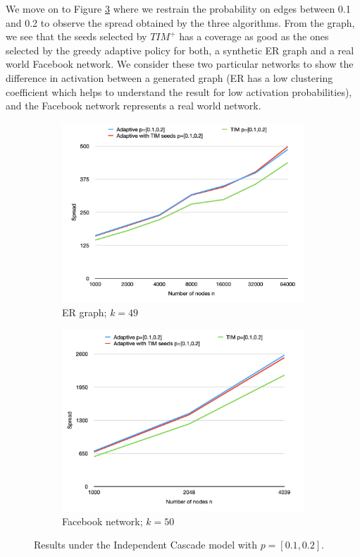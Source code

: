 We move on to Figure \ref{fig:figure_int} where we restrain the probability on edges between 0.1 and 0.2 to observe the spread obtained by the three algorithms. From the graph, we see that the seeds selected by $TIM^+$ has a coverage as good as the ones selected by the greedy adaptive policy for both, a synthetic ER graph and a real world Facebook network. We consider these two particular networks to show the difference in activation between a generated graph (ER has a low clustering coefficient which helps to understand the result for low activation probabilities), and the Facebook network represents a real world network. 



\begin{figure}
\centering
\begin{subfigure}{0.4\textwidth}
    \includegraphics[width=1\linewidth]{GSSI_thesisProposal/figures/ER_int_IC.png}
    \caption{ER graph; $k=49$}
    \label{fig:first_int}
\end{subfigure}
\hfill
\begin{subfigure}{0.4\textwidth}
    \includegraphics[width=1\linewidth]{GSSI_thesisProposal/figures/Fb_int_IC.png}
    \caption{Facebook network; $k=50$}
    \label{fig:second_int}
\end{subfigure}
\caption{Results under the Independent Cascade model with $p=[0.1,0.2]$.}
\label{fig:figure_int}
\end{figure}


